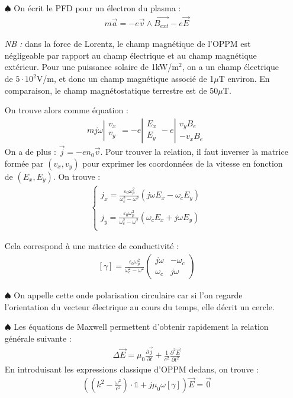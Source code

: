 \documentclass{report}
\newcommand*{\vect}[2]{
	\ensuremath{
    \left\lvert 
      \begin{matrix} 
        #1\\ 
        #2 
      \end{matrix}  
    \right.
  }}
\begin{document}
\begin{itemize}
	
	\item[$\spadesuit$] On écrit le PFD pour un électron du plasma :
	\begin{align*}
		m\vec{a}=-e\vec{v}\wedge\vec{B_{ext}}-e\vec{E}
	\end{align*}
	
	\textit{NB :} dans la force de Lorentz, le champ magnétique de l'OPPM est négligeable par rapport au champ électrique et au champ magnétique extérieur. Pour une puissance solaire de 1kW/m$^2$, on a un champ électrique de $5\cdot10^2$V/m, et donc un champ magnétique associé de 1$\mu$T environ. En comparaison, le champ magnétostatique terrestre est de 50$\mu$T.
	
	On trouve alors comme équation :
	\begin{align*}
		mj\omega\vect{v_x}	{v_y}=-e\vect{E_x}{E_y}-e\vect{v_yB_e}{-v_xB_e}	
	\end{align*}
	On a de plus : $\vec{j}=-en_0\vec{v}$. Pour trouver la relation, il faut inverser la matrice formée par $(v_x,v_y)$ pour exprimer les coordonnées de la vitesse en fonction de $(E_x,E_y)$.
	On trouve : 
	\begin{align*}
	\left\lbrace
	\begin{array}{ccc}
	j_x=\frac{\varepsilon_0\omega_p^2}{\omega^2_c-\omega^2}(j\omega E_x-\omega_cE_y)\\
	\\
	j_y=\frac{\varepsilon_0\omega_p^2}{\omega^2_c-\omega^2}(\omega_cE_x+j\omega E_y)\\
	\end{array}\right.
	\end{align*}	
	
	Cela correspond à une matrice de conductivité :
	\begin{align*}
		\left[\gamma \right] = \frac{\varepsilon_0\omega_p^2}{\omega^2_c-\omega^2}\begin{pmatrix}
			j\omega & -\omega_c \\ 
			\omega_c & j\omega
		\end{pmatrix}
	\end{align*}

	\item[$\spadesuit$] On appelle cette onde polarisation circulaire car si l'on regarde l'orientation du vecteur électrique au cours du temps, elle décrit un cercle.
	
	\item[$\spadesuit$] Les équations de Maxwell permettent d'obtenir rapidement la relation générale suivante :
	\begin{align*}
		\Delta \vec{E} = \mu_0\frac{\partial \vec{j}}{\partial t} +\frac{1}{c^2}\frac{\partial^2 \vec{E}}{\partial t^2}
	\end{align*}
	En introduisant les expressions classique d'OPPM dedans, on trouve :
	\begin{align*}
		\left( \left( k^2-\frac{\omega^2}{c^2}\right)\cdot\mathbb{1} +j\mu_0\omega\left[ \gamma\right] \right) \vec{E}=\vec{0}
	\end{align*}


\end{itemize}
\end{document}
